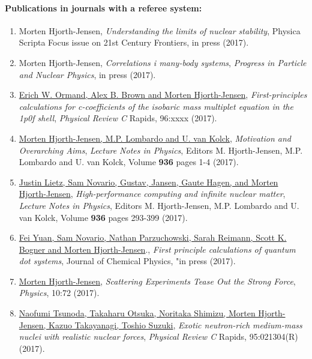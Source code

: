 \documentclass[a4wide,10pt]{article}
\begin{document}
\paragraph{Publications in journals with a referee system:}
\begin{enumerate}
\item Morten Hjorth-Jensen, \emph{Understanding the limits of nuclear stability}, Physica Scripta Focus issue on 21st Century Frontiers, in press (2017). 

\item Morten Hjorth-Jensen, \emph{Correlations i many-body systems}, \emph{Progress in Particle and Nuclear Physics}, in press (2017).

\item \href{{https://arxiv.org/abs/1608.08127}}{Erich W. Ormand, Alex B. Brown and Morten Hjorth-Jensen}, \emph{First-principles calculations for c-coefficients of the isobaric mass multiplet equation in the 1p0f shell}, \emph{Physical Review C} Rapids, 96:xxxx (2017). 

\item \href{{http://www.springer.com/us/book/9783319533353}}{Morten Hjorth-Jensen, M.P. Lombardo and U. van Kolck}, \emph{Motivation and Overarching Aims}, \emph{Lecture Notes in Physics}, Editors M. Hjorth-Jensen, M.P. Lombardo and U. van Kolck, Volume \textbf{936} pages 1-4 (2017).

\item \href{{http://www.springer.com/us/book/9783319533353}}{Justin Lietz, Sam Novario, Gustav, Jansen, Gaute Hagen, and Morten Hjorth-Jensen}, \emph{High-performance computing and infinite nuclear matter}, \emph{Lecture Notes in Physics}, Editors M. Hjorth-Jensen, M.P. Lombardo and U. van Kolck, Volume \textbf{936} pages 293-399 (2017).

\item \href{{http://lanl.arxiv.org/abs/1707.00229}}{Fei Yuan, Sam Novario, Nathan Parzuchowski, Sarah Reimann, Scott K. Bogner and Morten Hjorth-Jensen}.,   \emph{First principle calculations of quantum dot systems}, Journal of Chemical Physics, "in press (2017).

\item \href{{https://physics.aps.org/articles/v10/72}}{Morten Hjorth-Jensen}, \emph{Scattering Experiments Tease Out the Strong Force}, \emph{Physics}, 10:72 (2017).

\item \href{{https://journals.aps.org/prc/abstract/10.1103/PhysRevC.95.021304}}{Naofumi Tsunoda, Takaharu Otsuka, Noritaka Shimizu, Morten Hjorth-Jensen, Kazuo Takayanagi, Toshio Suzuki}, \emph{Exotic neutron-rich medium-mass nuclei with realistic nuclear forces}, \emph{Physical Review C} Rapids, 95:021304(R) (2017).


\end{enumerate}
\end{document}
